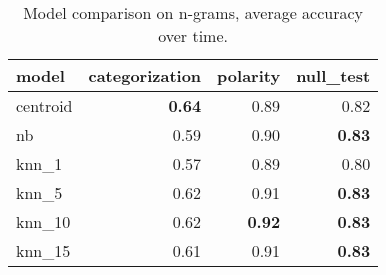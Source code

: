 \documentclass{article}
\begin{document}
\begin{table}
    \centering
    \caption{Model comparison on n-grams, average accuracy over time.}

    \begin{tabular}{lrrr}
    \toprule
        \bfseries model &  \bfseries categorization &  \bfseries polarity &  \bfseries null\_test \\
    \midrule
     centroid &  \bfseries    0.64 &               0.89 &                0.82 \\
           nb &               0.59 &               0.90 &  \bfseries     0.83 \\
        knn\_1 &              0.57 &               0.89 &                0.80 \\
        knn\_5 &              0.62 &               0.91 &  \bfseries     0.83 \\
       knn\_10 &              0.62 &  \bfseries    0.92 &  \bfseries     0.83 \\
       knn\_15 &              0.61 &               0.91 &  \bfseries     0.83 \\
    \bottomrule
    \end{tabular}
\end{table}
\end{document}
